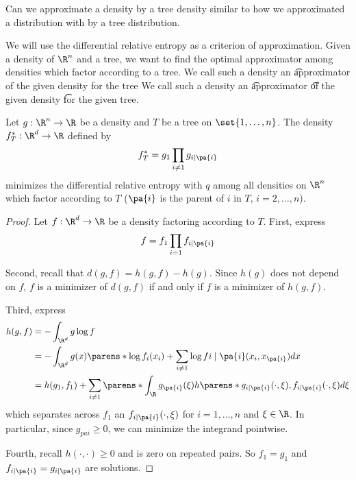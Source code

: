 

Can we approximate a density by a tree density similar to how we approximated a distribution with by a tree distribution.


We will use the differential relative entropy as a criterion of approximation.
Given a density of $\R^n$ and a tree, we want to find the optimal approximator among densities which factor according to a tree.
We call such a density an \t{approximator} of the given density for the tree
We call such a density an \t{approximator} \t{of} the given density \t{for} the given tree.


\begin{prop}

Let $g: \R^n \to \R$ be a density and $T$ be a tree on $\set{1, \dots, n}$.
The density $f^*_T: \R^d \to \R$ defined by
$$
  f^*_T = g_1 \prod_{i \neq 1} g_{i \mid \pa{i}}
$$
  minimizes the differential relative entropy with $q$ among all densities on $\R^n$ which factor according to $T$ ($\pa{i}$ is the parent of $i$ in $T$, $i = 2, \dots, n$).

\begin{proof}

Let $f: \R^d \to \R$ be a density factoring according to $T$. First, express
$$
  f = f_1 \prod_{i = 1} f_{i \mid \pa{i}}
$$

Second, recall that $d(g, f) = h(g, f) - h(g)$.
Since $h(g)$ does not depend on $f$, $f$ is a minimizer of $d(g, f)$ if and only if $f$ is a minimizer of $h(g, f)$.

Third, express
$$
\begin{aligned}
  h(g, f) &= - \int_{\R^d} g \log f \\
          &= - \int_{\R^d} g(x) \parens*{ \log f_{i}(x_i) + \sum_{i \neq 1} \log f{i \mid \pa{i}}(x_i, x_{\pa{i}})} dx \\
          &= h(g_1, f_1) + \sum_{i \neq 1} \parens*{ \int_{\R} g_{\pa{i}}(\xi) h\parens*{g_{i \mid \pa{i}}(\cdot, \xi), f_{i\mid\pa{i}}(\cdot,\xi)}d\xi}
\end{aligned}
$$
which separates across $f_1$ an $f_{i \mid \pa{i}}(\cdot, \xi)$ for $i = 1, \dots, n$ and $\xi \in \R$.
In particular, since $g_{pa{i}} \geq 0$,
we can minimize the integrand pointwise.

Fourth, recall $h(\cdot, \cdot) \geq 0$ and is zero on repeated pairs.
So $f_1 = g_1$ and $f_{i \mid \pa{i}} = g_{i \mid \pa{i}}$ are solutions.

\end{proof}

\end{prop}

